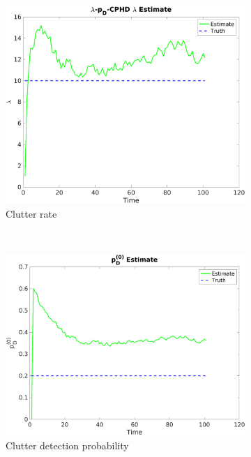 \documentclass{article}
\begin{document}
\begin{figure}[H]
  \centering
  \begin{subfigure}[t]{0.32\textwidth}
    \centering
    \includegraphics[width=1\linewidth]{high_ps/lpdcphd_lambda_hat.png}
    \caption{Clutter rate}
  \end{subfigure}%
  ~ 
  \begin{subfigure}[t]{0.32\textwidth}
    \centering
    \includegraphics[width=1\linewidth]{high_ps/pd0_hat.png}
    \caption{Clutter detection probability}
  \end{subfigure}
  ~ 
  \begin{subfigure}[t]{0.32\textwidth}

\end{subfigure}
\end{figure}
\end{document}
